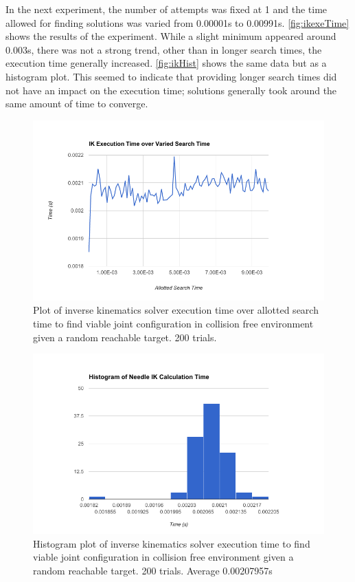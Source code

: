 \documentclass[12pt]{report}
\begin{document}
In the next experiment, the number of attempts was fixed at 1 and the time allowed for finding solutions was varied from 0.00001s to 0.00991s. \autoref{fig:ikexeTime} shows the results of the experiment. While a slight minimum appeared around 0.003s, there was not a strong trend, other than in longer search times, the execution time generally increased. \autoref{fig:ikHist} shows the same data but as a histogram plot. This seemed to indicate that providing longer search times did not have an impact on the execution time; solutions generally took around the same amount of time to converge.

\begin{figure}[thpb]
	\centering
	\includegraphics[width = 5in]{graphs/ik_exec_time_over_allowed.png}
    \caption{Plot of inverse kinematics solver execution time over allotted search time to find viable joint configuration in collision free environment given a random reachable target. 200 trials.}
    \label{fig:ikexeTime}
\end{figure}

\begin{figure}[thpb]
	\centering
	\includegraphics[width = 5in]{graphs/ik_hist_1_attempt.png}
    \caption{Histogram plot of inverse kinematics solver execution time to find viable joint configuration in collision free environment given a random reachable target. 200 trials. Average 0.00207957s}
    \label{fig:ikHist}
\end{figure}
\end{document}
